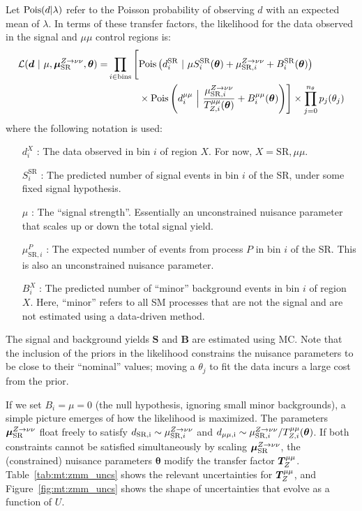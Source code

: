 Let $\mathrm{Pois}(d|\lambda)$ refer to the Poisson probability of observing $d$ with an expected mean of $\lambda$.
In terms of these transfer factors, the likelihood for the data observed in the signal and $\mu\mu$ control regions is:
\begin{align}
    \mathcal{L}(\bm{d} ~|~ \mu,\muz,\bm{\theta}) = & \prod_{i\in\mathrm{bins}} \left[
    \pois\left(d^{\mathrm{SR}}_{i} ~|~ \mu S^{\mathrm{SR}}_{i}(\bm\theta)  + \muzi + B^{\mathrm{SR}}_{i}(\bm\theta)\right) \vphantom{\frac{\muzi}{\Ti{\mu\mu}{Z}(\bm\theta)}}\right. \nonumber \\
    & \left. \phantom{\prod_{i\in\mathrm{bins}}\Big[} \times \pois\left(d^{\mu\mu}_i~\Big|~ \frac{\muzi}{\Ti{\mu\mu}{Z}(\bm\theta)} + B^{\mu\mu}_i(\bm\theta) \right)\right]  \times  \prod_{j=0}^{n_\theta} p_j(\theta_j)
    \label{eq:mt:lhood}
\end{align}
where the following notation is used:
\begin{itemize}
    \item[$d^X_i$]: The data observed in bin $i$ of region $X$. For now, $X=\mathrm{SR},\mu\mu$.
    \item[$S^\mathrm{SR}_i$]: The predicted number of signal events in bin $i$ of the SR, under some fixed signal hypothesis.
    \item[$\mu$]: The ``signal strength''. Essentially an unconstrained nuisance parameter that scales up or down the total signal yield.
    \item[$\mu_{\mathrm{SR},i}^P$]: The expected number of events from process $P$ in bin $i$ of the SR. This is also an unconstrained nuisance parameter.
    \item[$B^X_i$]: The predicted number of ``minor'' background events in bin $i$ of region $X$. Here, ``minor'' refers to all SM processes that are not the signal and are not estimated using a data-driven method.
\end{itemize}
The signal and background yields $\bm{S}$ and $\bm{B}$ are estimated using MC.
Note that the inclusion of the priors in the likelihood constrains the nuisance parameters to be close to their ``nominal'' values; moving a $\theta_j$ to fit the data incurs a large cost from the prior.

If we set $B_i = \mu = 0$ (the null hypothesis, ignoring small minor backgrounds), a simple picture emerges of how the likelihood is maximized.
The parameters $\bm{\mu}_{\mathrm{SR}}^{Z\rightarrow\nu\nu}$ float freely to satisfy $d_\mathrm{SR,i} \sim \mu_{\mathrm{SR},i}^{Z\rightarrow\nu\nu}$ and $d_\mathrm{\mu\mu,i}\sim \mu_{\mathrm{SR},i}^{Z\rightarrow\nu\nu} / {T}^{\mu\mu}_{Z,i}(\bm\theta)$.
If both constraints cannot be satisfied simultaneously by scaling $\bm{\mu}_{\mathrm{SR}}^{Z\rightarrow\nu\nu}$, the (constrained) nuisance parameters $\bm\theta$ modify the transfer factor $\bm{T}^{\mu\mu}_{Z}$.
Table~\ref{tab:mt:zmm_uncs} shows the relevant uncertainties for $\bm{T}^{\mu\mu}_{Z}$, and Figure~\ref{fig:mt:zmm_uncs} shows the shape of uncertainties that evolve as a function of $U$.

